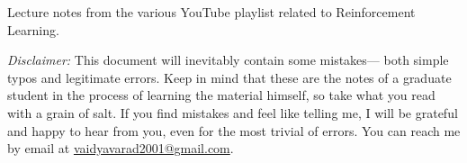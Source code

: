 Lecture notes from the various YouTube playlist related to Reinforcement Learning. 

\textit{Disclaimer:} This document will inevitably contain some mistakes— both
simple typos and legitimate errors. Keep in mind that these are the notes of a graduate student in the process of learning the material himself, so take
what you read with a grain of salt. If you find mistakes and feel like telling
me, I will be grateful and happy to hear from you, even for the most trivial of
errors. You can reach me by email at
\href{mailto:vaidyavaraa2001@gmail.com}{vaidyavarad2001@gmail.com}.